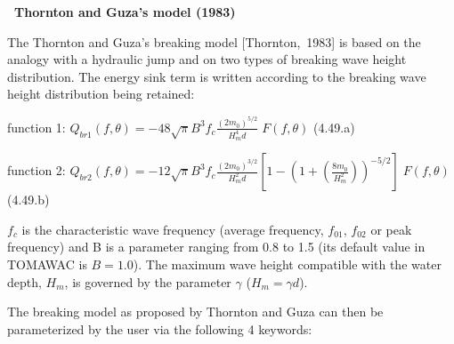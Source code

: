 {\bf  ~Thornton and Guza's model (1983)}

 The Thornton and Guza's breaking model [Thornton,~1983] is based on the analogy with a hydraulic jump and on two types of breaking wave height distribution. The energy sink term is written according to the breaking wave height distribution being retained:

function 1: $Q_{br1} \left(f,\theta \right)=-48\sqrt{\pi } B^{3} f_{c} \frac{\left(2m_{0} \right)^{5/2} }{H_{m}^{4} d} \; F\left(f,\theta \right)$ (4.49.a)

function 2: $Q_{br2} \left(f,\theta \right)=-12\sqrt{\pi } B^{3} f_{c} \frac{\left(2m_{0} \right)^{3/2} }{H_{m}^{2} d} \left[1-\left(1+\left(\frac{8m_{0} }{H_{m}^{2} } \right)\right)^{-5/2} \right]\; F\left(f,\theta \right)$ (4.49.b)

 $f_{c} $ is the characteristic wave frequency (average frequency, $f_{01} $, $f_{02} $ or peak frequency) and B is a parameter ranging from 0.8 to 1.5 (its default value in TOMAWAC is $B=1.0$). The maximum wave height compatible with the water depth, $H_{m} $, is governed by the parameter $\gamma $ ($H_{m} =\gamma d$).

 The breaking model as proposed by Thornton and Guza can then be parameterized by the user via the following 4 keywords:


